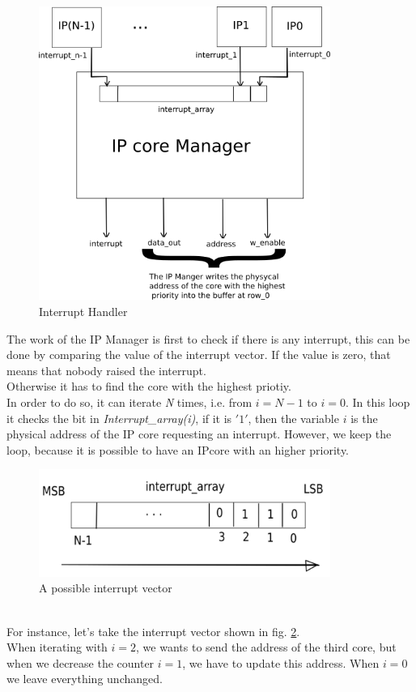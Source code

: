 \begin{figure}[h!]
	\centering	
	\includegraphics[width=0.85\textwidth]{imm/ip_func/interrupt.png}  
	\caption{Interrupt Handler} 
	\label{interrupt}
\end{figure}
The work of the IP Manager is first to check if there is any interrupt, this can be done by comparing the value of the interrupt vector. If the value is zero, that means that nobody raised the interrupt.\\
Otherwise it has to find the core with the highest priotiy.\\
In order to do so, it can iterate \textit{N} times, i.e. from $ i=N-1 $ to $ i=0 $. In this loop it checks the bit in \textit{Interrupt\_array(i)}, if it is $ '1' $, then the variable $ i $ is the physical address of the IP core requesting an interrupt. However, we keep the loop, because it is possible to have an IPcore with an higher priority.
\begin{figure}[h!]
	\centering	
	\includegraphics[width=0.85\textwidth]{imm/ip_func/int_vector.png}  
	\caption{A possible interrupt vector} 
	\label{int_vector}
\end{figure}\\
For instance, let's take the interrupt vector shown in fig. \ref{int_vector}.\\
When iterating with $ i=2 $, we wants to send the address of the third core, but when we decrease the counter $ i=1 $, we have to update this address. When $ i=0 $ we leave everything unchanged.
 